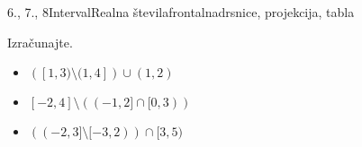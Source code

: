 \begin{priprava}{6., 7., 8}{}{Interval}{Realna števila}{frontalna}{drsnice, projekcija, tabla}
\begin{multicols}{2}
        
            \begin{naloga}
                Izračunajte.
                \begin{itemize}
                        \item $\left([1,3)\setminus(1,4]\right)\cup(1,2)$ 
                        \item $[-2,4]\setminus\left((-1,2]\cap[0,3)\right)$ 
                        \item $\left((-2,3]\setminus[-3,2)\right)\cap[3,5)$ 
                \end{itemize}
            \end{naloga}
        
        \end{multicols}

    
\end{priprava}